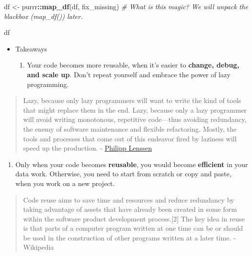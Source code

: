 \documentclass[
]{book}
\newenvironment{Shaded}{\begin{snugshade}}{\end{snugshade}}
\newcommand{\CommentTok}[1]{\textcolor[rgb]{0.56,0.35,0.01}{\textit{#1}}}
\newcommand{\KeywordTok}[1]{\textcolor[rgb]{0.13,0.29,0.53}{\textbf{#1}}}
\newcommand{\NormalTok}[1]{#1}
\newcommand{\OperatorTok}[1]{\textcolor[rgb]{0.81,0.36,0.00}{\textbf{#1}}}
\newcommand{\StringTok}[1]{\textcolor[rgb]{0.31,0.60,0.02}{#1}}
\providecommand{\tightlist}{%
  \setlength{\itemsep}{0pt}\setlength{\parskip}{0pt}}
\begin{document}
\begin{Shaded}
\begin{Highlighting}[]
\NormalTok{df <{-}}\StringTok{ }\NormalTok{purrr}\OperatorTok{::}\KeywordTok{map\_df}\NormalTok{(df, fix\_missing) }\CommentTok{\# What is this magic? We will unpack the blackbox (\textasciigrave{}map\_df()\textasciigrave{}) later.}

\NormalTok{df}
\end{Highlighting}
\end{Shaded}

\begin{itemize}
\item
  Takeaways

  \begin{enumerate}
  \def\labelenumi{\arabic{enumi}.}
  \tightlist
  \item
    Your code becomes more reusable, when it's easier to \textbf{change, debug, and scale up}. Don't repeat yourself and embrace the power of lazy programming.
  \end{enumerate}
\end{itemize}

\begin{quote}
Lazy, because only lazy programmers will want to write the kind of tools that might replace them in the end. Lazy, because only a lazy programmer will avoid writing monotonous, repetitive code---thus avoiding redundancy, the enemy of software maintenance and flexible refactoring. Mostly, the tools and processes that come out of this endeavor fired by laziness will speed up the production. - \href{http://blogoscoped.com/archive/2005-08-24-n14.html}{Philipp Lenssen}
\end{quote}

\begin{enumerate}
\def\labelenumi{\arabic{enumi}.}
\setcounter{enumi}{1}
\tightlist
\item
  Only when your code becomes \textbf{reusable}, you would become \textbf{efficient} in your data work. Otherwise, you need to start from scratch or copy and paste, when you work on a new project.
\end{enumerate}

\begin{quote}
Code reuse aims to save time and resources and reduce redundancy by taking advantage of assets that have already been created in some form within the software product development process.{[}2{]} The key idea in reuse is that parts of a computer program written at one time can be or should be used in the construction of other programs written at a later time. - Wikipedia
\end{quote}
\end{document}
